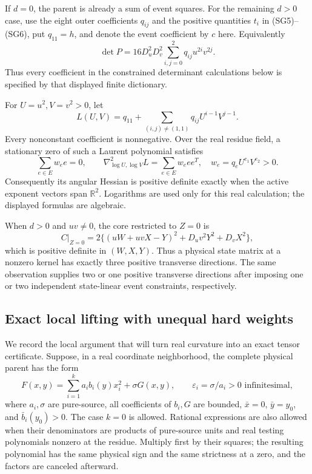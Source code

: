 If $d=0$, the parent is already a sum of event squares.
For the remaining $d>0$ case, use the eight outer coefficients
$q_{ij}$ and the positive quantities $t_i$ in (SG5)--(SG6), put
$q_{11}=h$, and denote the event coefficient by $c$ here. Equivalently
\[
 \det P=16D_u^2D_v^2\sum_{i,j=0}^2q_{ij}u^{2i}v^{2j}.
 \tag{NC2}
\]
Thus every coefficient in the constrained determinant calculations
below is specified by that displayed finite dictionary.

For $U=u^2,V=v^2>0$, let
\[
 L(U,V)=q_{11}+\sum_{(i,j)\ne(1,1)}q_{ij}U^{i-1}V^{j-1}.
 \tag{NC4}
\]
Every nonconstant coefficient is nonnegative. Over the real residue
field, a stationary zero of such a Laurent polynomial satisfies
\[
 \sum_{e\in E}w_e e=0,\qquad
 \nabla^2_{\log U,\log V}L=\sum_{e\in E}w_e ee^T,
 \quad w_e=q_eU^{e_1}V^{e_2}>0.                       \tag{NC5}
\]
Consequently its angular Hessian is positive definite exactly when
the active exponent vectors span $\mathbb R^2$. Logarithms are used
only for this real calculation; the displayed formulas are algebraic.

When $d>0$ and $uv\ne0$, the core restricted to $Z=0$ is
\[
 C|_{Z=0}=2\{(uW+uvX-Y)^2+D_uv^2Y^2+D_vX^2\},       \tag{NC6}
\]
which is positive definite in $(W,X,Y)$. Thus a physical state matrix
at a nonzero kernel has exactly three positive transverse directions.
The same observation supplies two or one positive transverse
directions after imposing one or two independent state-linear event
constraints, respectively.

\subsection{Exact local lifting with unequal hard weights}

We record the local argument that will turn real curvature into an
exact tensor certificate. Suppose, in a real coordinate neighborhood,
the complete physical parent has the form
\[
 F(x,y)=\sum_{i=1}^k a_i b_i(y)x_i^2+\sigma G(x,y),
 \qquad \varepsilon_i=\sigma/a_i>0\text{ infinitesimal},
 \tag{NC7}
\]
where $a_i,\sigma$ are pure-source, all coefficients of $b_i,G$ are
bounded, $\bar x=0$, $\bar y=y_0$, and $\bar b_i(y_0)>0$.
The case $k=0$ is allowed. Rational expressions are also allowed when
their denominators are products of pure-source units and real testing
polynomials nonzero at the residue. Multiply first by their squares;
the resulting polynomial has the same physical sign and the same
strictness at a zero, and the factors are canceled afterward.

